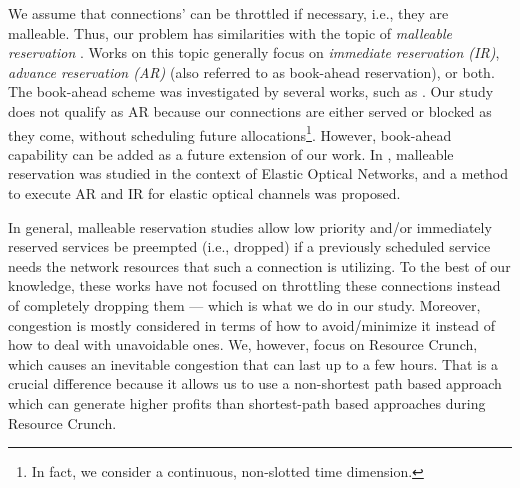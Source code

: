 \documentclass[journal]{IEEEtran}
\begin{document}
We assume that connections' can be throttled if necessary, i.e., they are malleable. Thus, our problem has similarities with the topic of \textit{malleable reservation} \cite{1250324}. Works on this topic generally focus on \textit{immediate reservation (IR)}, \textit{advance reservation (AR)} (also referred to as book-ahead reservation), or both. The book-ahead scheme was investigated by several works, such as \cite{665112,759312, 4351893}. Our study does not qualify as AR because our connections are either served or blocked as they come, without scheduling future allocations\footnote{In fact, we consider a continuous, non-slotted time dimension.}. However, book-ahead capability can be added as a future extension of our work. In \cite{Lu:15}, malleable reservation was studied in the context of Elastic Optical Networks, and a method to execute AR and IR for elastic optical channels was proposed.

In general, malleable reservation studies allow low priority and/or immediately reserved services be preempted (i.e., dropped) if a previously scheduled service needs the network resources that such a connection is utilizing. To the best of our knowledge, these works have not focused on throttling these connections instead of completely dropping them --- which is what we do in our study. Moreover, congestion is mostly considered in terms of how to avoid/minimize it instead of how to deal with unavoidable ones. We, however, focus on Resource Crunch, which causes an inevitable congestion that can last up to a few hours. That is a crucial difference because it allows us to use a non-shortest path based approach which can generate higher profits than shortest-path based approaches during Resource Crunch.
\end{document}
